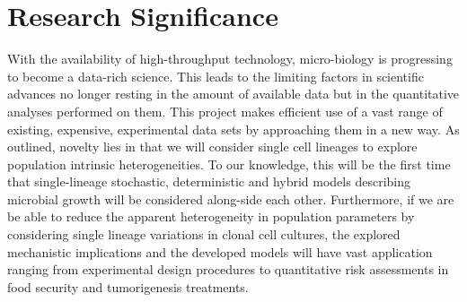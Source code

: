 \documentclass{bioinfo}
\begin{document}
\section{Research Significance}
With the availability of high-throughput technology, micro-biology is progressing to become a data-rich science. This leads to the limiting factors in scientific advances no longer resting in the amount of available data but in the quantitative analyses performed on them. This project makes efficient use of a vast range of existing, expensive, experimental data sets by approaching them in a new way. As outlined, novelty lies in that we will consider single cell lineages to explore population intrinsic heterogeneities. To our knowledge, this will be the first time that single-lineage stochastic, deterministic and hybrid models describing microbial growth will be considered along-side each other. Furthermore, if we are be able to reduce the apparent heterogeneity in population parameters by considering single lineage variations in clonal cell cultures, the explored mechanistic implications and the developed models will have vast application ranging from experimental design procedures to quantitative risk assessments in food security and tumorigenesis treatments. 
\end{document}
